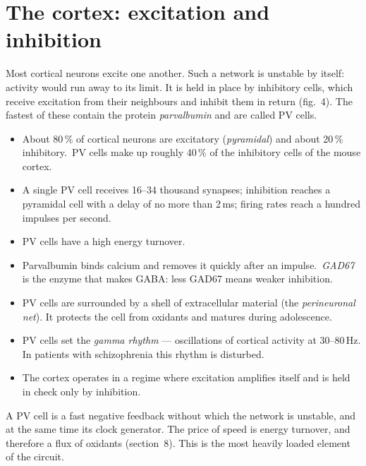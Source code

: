 \section{The cortex: excitation and inhibition}
Most cortical neurons excite one another. Such a network is unstable by itself: activity would run away to its limit. It is held in place by inhibitory cells, which receive excitation from their neighbours and inhibit them in return (fig.~4). The fastest of these contain the protein \emph{parvalbumin} and are called PV cells.
\facts
\begin{itemize}
\item About 80\,\% of cortical neurons are excitatory (\emph{pyramidal}) and about 20\,\% inhibitory.\tU\ PV cells make up roughly 40\,\% of the inhibitory cells of the mouse cortex.\tU
\item A single PV cell receives 16--34 thousand synapses; inhibition reaches a pyramidal cell with a delay of no more than 2\,ms; firing rates reach a hundred impulses per second.\tS
\item PV cells have a high energy turnover.\tS
\item Parvalbumin binds calcium and removes it quickly after an impulse.\tU\ \emph{GAD67} is the enzyme that makes GABA: less GAD67 means weaker inhibition.\tU
\item PV cells are surrounded by a shell of extracellular material (the \emph{perineuronal net}). It protects the cell from oxidants and matures during adolescence.\tS
\item PV cells set the \emph{gamma rhythm} --- oscillations of cortical activity at 30--80\,Hz. In patients with schizophrenia this rhythm is disturbed.\tU
\item The cortex operates in a regime where excitation amplifies itself and is held in check only by inhibition.\tS
\end{itemize}
\begin{ineq}
A PV cell is a fast negative feedback without which the network is unstable, and at the same time its clock generator. The price of speed is energy turnover, and therefore a flux of oxidants (section~8). This is the most heavily loaded element of the circuit.
\end{ineq}
